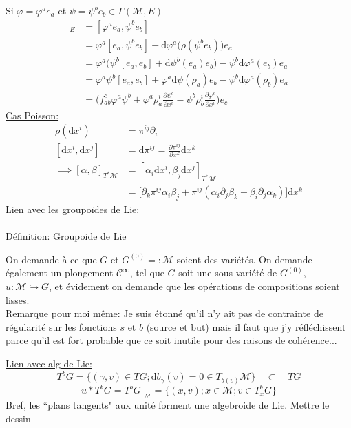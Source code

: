 \documentclass[a4paper,11pt]{article}
\renewcommand{\d}{{\mathrm{d}}}
\newcommand{\dr}[2]{\frac{\partial {#1}}{\partial{#2}}}
\begin{document}
\noindent Si $\varphi = \varphi^a e_a$ et $\psi=\psi^be_b \in \Gamma(\mathcal{M},E)$
\begin{align*}
[\varphi,\psi]_E &= [\varphi^ae_a,\psi^be_b]\\
&= \varphi^a[e_a,\psi^be_b] - \d\varphi^a \Big(\rho(\psi^be_b)\Big)e_a\\
&= \varphi^a\Big(\psi^b[e_a,e_b]+\d\psi^b(e_a)e_b\Big)-\psi^b\d\varphi^a(e_b)e_a\\
&= \varphi^a\psi^b[e_a,e_b] + \varphi^a\d\psi(\rho_a)e_b - \psi^b\d\varphi^a(\rho_b)e_a\\
&=\Big(f^c_{ab}\varphi^a\psi^b + \varphi^a\rho^i_a\dr{\psi^c}{x^i} - \psi^b\rho^i_b \dr{\varphi^c}{x^i}\Big)e_c
\end{align*} 
\underline{Cas Poisson:}
\begin{align*}
\rho(\d x^i) &= \pi^{ij}\partial_i\\
[\d x^i,\d x^j] &= \d \pi^{ij} = \dr{\pi^{ij}}{x^k} \d x^k\\
\implies [\alpha,\beta]_{T^*\mathcal{M}} &= [\alpha_i \d x^i, \beta_j \d x^j]_{T^*\mathcal M}\\
&= \Big[\partial_k \pi^{ij}\alpha_i\beta_j + \pi^{ij}(\alpha_i\partial_j\beta_k - \beta_i \partial_j \alpha_k)\Big]\d x^k
\end{align*}
\underline{Lien avec les groupoïdes de Lie:}\\ \\
\underline{Définition:} Groupoide de Lie

On demande à ce que $G$ et $G^{(0)}=:\mathcal{M}$ soient des variétés. On demande également un plongement $\mathcal{C}^\infty$, tel que $G$ soit une sous-variété de $G^{(0)}$, $u: \mathcal{M}\hookrightarrow G$, et évidement on demande que les opérations de compositions soient lisses.\\
\color{red}Remarque pour moi même: Je suis étonné qu'il n'y ait pas de contrainte de régularité sur les fonctions $s$ et $b$ (source et but) mais il faut que j'y réfléchissent parce qu'il est fort probable que ce soit inutile pour des raisons de cohérence...\color{black}

\noindent\underline{Lien avec alg de Lie:}
$$T^bG = \Big\{(\gamma,v) \in TG; \d b_\gamma(v)=0\in T_{b(v)}\mathcal{M}\Big\}\quad\subset\quad TG$$
$$u*T^bG = T^bG|_\mathcal{M} = \Big\{(x,v); x\in \mathcal{M}; v\in T_x ^b G\Big\}$$
Bref, les ``plans tangents" aux unité forment une algebroide de Lie. \color{red} Mettre le dessin \color{black}\\
\end{document}
